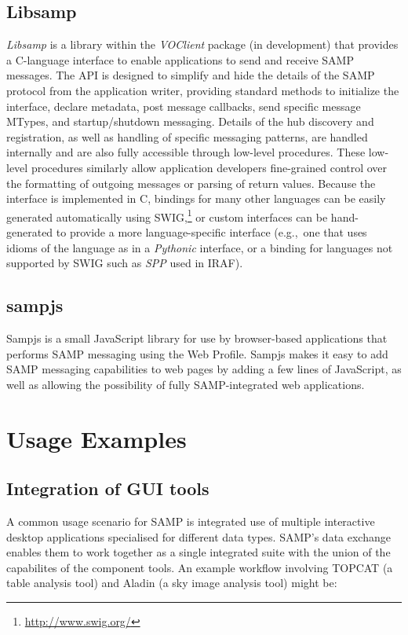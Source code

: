 \subsection{Libsamp}

{\em Libsamp\/} is a library within the {\em VOClient\/} package
(in development)
that provides a C-language interface to enable applications to send and
receive SAMP messages.  The API is designed to simplify and hide the details
of the SAMP protocol from the application writer, providing standard methods
to initialize the interface, declare metadata, post message callbacks,
send specific message MTypes, and startup/shutdown messaging.
Details of the hub discovery and registration, as well as handling of
specific messaging patterns, are handled internally and are also fully
accessible through low-level procedures.  These low-level procedures
similarly allow application developers fine-grained control over the
formatting of outgoing messages or parsing of return values.  Because the
interface is implemented in C, bindings for many other languages can be
easily generated automatically using SWIG,\footnote{\url{http://www.swig.org/}}
or custom interfaces can be hand-generated to provide a more language-specific
interface (e.g.,\ one that uses idioms of the language as in a {\em Pythonic\/}
interface, or a binding for languages not supported by SWIG such as {\em SPP\/}
used in IRAF).

\subsection{sampjs}

Sampjs is a small JavaScript library for use by browser-based
applications that performs SAMP messaging using the Web Profile.
Sampjs makes it easy to add SAMP messaging capabilities to web pages by
adding a few lines of JavaScript, as well as allowing the possibility
of fully SAMP-integrated web applications.

\section{Usage Examples}
\label{sec:B2_usage}

\subsection{Integration of GUI tools}

A common usage scenario for SAMP is integrated use of
multiple interactive desktop applications specialised for different data types.
SAMP's data exchange enables them to work together as a single
integrated suite with the union of the capabilites of the component tools.
An example workflow involving TOPCAT (a table analysis tool)
and Aladin (a sky image analysis tool) might be:

